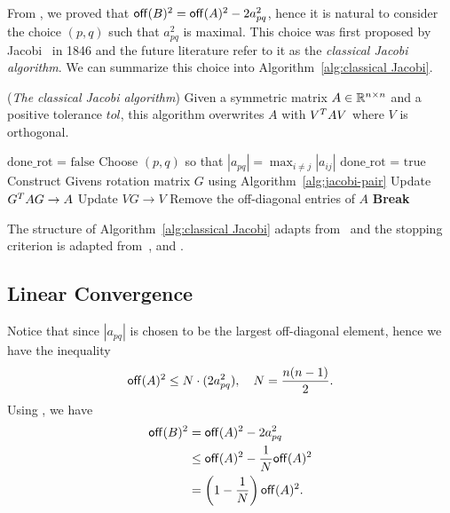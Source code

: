 From , we proved  that $\mathsf{off}(B)^2 = \mathsf{off}(A)^2 - 2a_{pq}^2$, hence it is natural to consider the choice $(p,q)$ such that $a_{pq}^2$ is maximal. This choice was first proposed by Jacobi~\cite{Jacobi-original-paper-1846} in 1846 and the future literature refer to it as the \emph{classical Jacobi algorithm}. We can summarize this choice into Algorithm~\ref{alg:classical Jacobi}.


\begin{algorithm}[ht]
  \caption{({\itshape The classical Jacobi algorithm}) Given a symmetric matrix $A\in\mathbb{R}^{n\times n}$ and a positive tolerance $tol$, this algorithm overwrites $A$ with $V^T AV$ where $V$ is orthogonal.}
  \label{alg:classical Jacobi}
  \begin{algorithmic}[1]
    \State $\text{done\_rot = false}$
    \State Choose $(p,q)$ so that $|a_{pq}| = \max_{i\neq j}|a_{ij}|$
      \State $\text{done\_rot = true}$
      \State Construct Givens rotation matrix $G$ using Algorithm~\ref{alg:jacobi-pair}
      \State Update $G^T A G \to A$
      \State Update $VG \to V$
    \Else
      \State Remove the off-diagonal entries of $A$
      \State \textbf{Break}
    \EndIf
  \EndWhile
  \end{algorithmic}
\end{algorithm}

The structure of Algorithm~\ref{alg:classical Jacobi} adapts from~ and the stopping criterion is adapted from~,  and .

\subsection{Linear Convergence}

Notice that since $|a_{pq}|$ is chosen to be the largest off-diagonal element, hence we have the inequality
\begin{equation}
    \label{eq:3.1}
    \mathsf{off}(A)^2 \leq N\cdot(2a_{pq}^2),\quad N = \frac{n(n-1)}{2}.
\end{equation}
Using , we have 
\begin{equation}
    \label{eq:3.2}
    \begin{aligned}
        \mathsf{off}(B)^2 &= \mathsf{off}(A)^2 - 2a_{pq}^2 \\
        & \leq \mathsf{off}(A)^2 - \frac{1}{N}\mathsf{off}(A)^2 \\
        & = \left(1-\frac{1}{N}\right) \mathsf{off}(A)^2.
    \end{aligned}
\end{equation}

